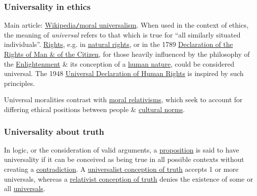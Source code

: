 \documentclass{article}
\begin{document}
\subsubsection{Universality in ethics}
Main article: \href{https://en.wikipedia.org/wiki/Moral_universalism}{Wikipedia{\tt/}moral universalism}. When used in the context of ethics, the meaning of {\it universal} refers to that which is true for ``all similarly situated individuals''. \href{https://en.wikipedia.org/wiki/Rights}{Rights}, e.g. in \href{https://en.wikipedia.org/wiki/Natural_rights}{natural rights}, or in the 1789 \href{https://en.wikipedia.org/wiki/Declaration_of_the_Rights_of_Man_and_of_the_Citizen}{Declaration of the Rights of Man \& of the Citizen}, for those heavily influenced by the philosophy of the \href{https://en.wikipedia.org/wiki/Age_of_Enlightenment}{Enlightenment} \& its conception of a \href{https://en.wikipedia.org/wiki/Human_nature}{human nature}, could be considered universal. The 1948 \href{https://en.wikipedia.org/wiki/Universal_Declaration_of_Human_Rights}{Universal Declaration of Human Rights} is inspired by such principles.

Universal moralities contrast with \href{https://en.wikipedia.org/wiki/Moral_relativism}{moral relativisms}, which seek to account for differing ethical positions between people \& \href{https://en.wikipedia.org/wiki/Social_norm}{cultural norms}.

\subsubsection{Universality about truth}
In logic, or the consideration of valid arguments, a \href{https://en.wikipedia.org/wiki/Proposition}{proposition} is said to have universality if it can be conceived as being true in all possible contexts without creating a \href{https://en.wikipedia.org/wiki/Contradiction}{contradiction}. A \href{https://en.wikipedia.org/wiki/Universalism}{universalist conception of truth} accepts 1 or more universals, whereas a \href{https://en.wikipedia.org/wiki/Relativism}{relativist conception of truth} denies the existence of some or all \href{https://en.wikipedia.org/wiki/Problem_of_universals}{universals}.
\end{document}
